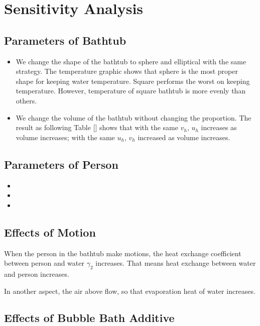 \documentclass[12pt,a4paper,titlepage]{article}
\begin{document}
\section{Sensitivity Analysis}
\label{sec:sensitivity-analysis}

\subsection{Parameters of Bathtub}
\label{sec:parameters of bathtub}
\begin{itemize}
\item We change the shape of the bathtub to sphere and elliptical with the same strategy. The temperature graphic shows that sphere is the most proper shape for keeping water temperature. Square performs the worst on keeping temperature. However, temperature of square bathtub is more evenly than others.
\item We change the volume of the bathtub without changing the proportion. The result as following Table [] shows that with the same $v_h$, $u_h$ increases as volume increases; with the same $u_h$, $v_h$ increased as volume increases.
\end{itemize}

\subsection{Parameters of Person}
\label{sec:parameters of person}
\begin{itemize}
\item
\item
\item
\end{itemize}

\subsection{Effects of Motion}
\label{sec:effects of motion}
When the person in the bathtub make motions, the heat exchange coefficient between person and water ${\gamma}_2$ increases. That means heat exchange between water and person increases. 
 
In another aspect, the air above flow, so that evaporation heat of water increases.

\subsection{Effects of Bubble Bath Additive}
\label{sec:effects of bubble bath additive}
\end{document}
